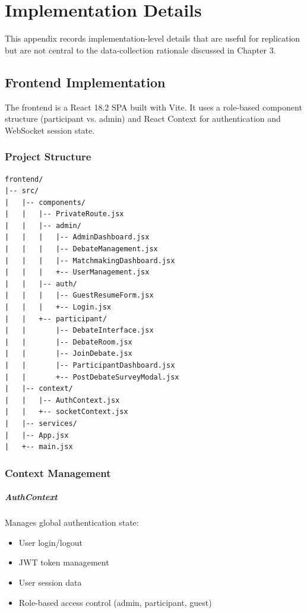 \chapter{Implementation Details}

This appendix records implementation-level details that are useful for replication but are
not central to the data-collection rationale discussed in Chapter 3.

\section{Frontend Implementation}

The frontend is a React 18.2 SPA built with Vite. It uses a role-based component structure
(participant vs. admin) and React Context for authentication and WebSocket session state.

\subsection{Project Structure}
\begin{verbatim}
frontend/
|-- src/
|   |-- components/
|   |   |-- PrivateRoute.jsx
|   |   |-- admin/
|   |   |   |-- AdminDashboard.jsx
|   |   |   |-- DebateManagement.jsx
|   |   |   |-- MatchmakingDashboard.jsx
|   |   |   +-- UserManagement.jsx
|   |   |-- auth/
|   |   |   |-- GuestResumeForm.jsx
|   |   |   +-- Login.jsx
|   |   +-- participant/
|   |       |-- DebateInterface.jsx
|   |       |-- DebateRoom.jsx
|   |       |-- JoinDebate.jsx
|   |       |-- ParticipantDashboard.jsx
|   |       +-- PostDebateSurveyModal.jsx
|   |-- context/
|   |   |-- AuthContext.jsx
|   |   +-- socketContext.jsx
|   |-- services/
|   |-- App.jsx
|   +-- main.jsx
\end{verbatim}

\subsection{Context Management}

\paragraph{AuthContext}
Manages global authentication state:
\begin{itemize}
    \item User login/logout
    \item JWT token management
    \item User session data
    \item Role-based access control (admin, participant, guest)
\end{itemize}

